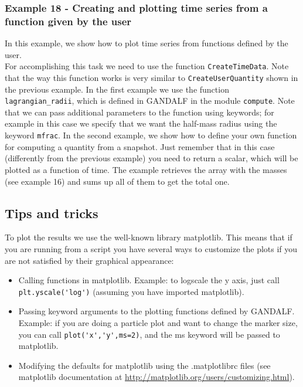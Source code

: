 \documentclass[a4paper]{article}
\begin{document}
\subsubsection{Example  18 - Creating and plotting time series from a function given by the user}
In this example, we show how to plot time series from functions defined by the user.  \\








\noindent For accomplishing this task we need to use the function \lstinline{CreateTimeData}. Note that the way this function works is very similar to \lstinline{CreateUserQuantity} shown in the previous example. In the first example we use the function \lstinline{lagrangian_radii}, which is defined in GANDALF in the module \lstinline{compute}. Note that we can pass additional parameters to the function using keywords; for example in this case we specify that we want the half-mass radius using the keyword \lstinline{mfrac}. In the second example, we show how to define your own function for computing a quantity from a snapshot. Just remember that in this case (differently from the previous example) you need to return a scalar, which will be plotted as a function of time. The example retrieves the array with the masses (see example 16) and sums up all of them to get the total one.


\subsection{Tips and tricks}

To plot the results we use the well-known library matplotlib. This means that if you are running from a script you have several ways to customize the plots if you are not satisfied by their graphical appearance:
\begin{itemize}
\item Calling functions in matplotlib. Example: to logscale the y axis, just call \lstinline{plt.yscale('log')} (assuming you have imported matplotlib).
\item Passing keyword arguments to the plotting functions defined by GANDALF. Example: if you are doing a particle plot and want to change the marker size, you can call \lstinline{plot('x','y',ms=2)}, and the ms keyword will be passed to matplotlib.
\item Modifying the defaults for matplotlib using the .matplotlibrc files (see matplotlib documentation at \url{http://matplotlib.org/users/customizing.html}).
\end{itemize}
\end{document}
